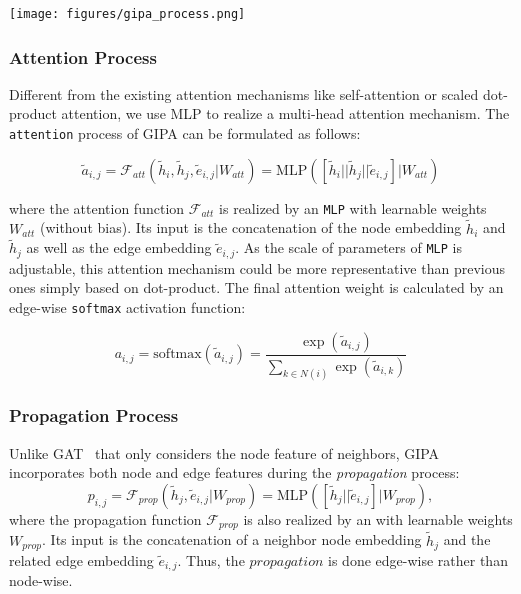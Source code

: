 \documentclass[sigconf]{acmart}
\newcommand{\model}{GIPA\xspace}
\begin{document}
\begin{figure*}
    \centering
    \texttt{[image: figures/gipa\_process.png]}
    \caption{Process of \model, which consists of \textit{attention}, \textit{propagation}, and \textit{aggregation} process.}
    \label{fig:gipa_process}
\end{figure*}

\subsubsection{Attention Process}

Different from the existing attention mechanisms like self-attention or scaled dot-product attention, we use MLP to realize a multi-head attention mechanism.
The \texttt{attention} process of \model can be formulated as follows:

\begin{equation}
\label{eq:att}
\tilde{a}_{i, j} = \mathcal{F}_{att}(\tilde{h}_i, \tilde{h}_j, \tilde{e}_{i, j}|W_{att}) = \text{MLP}([\tilde{h}_i || \tilde{h}_j || \tilde{e}_{i, j}]|W_{att})
\end{equation}

\noindent where the attention function $\mathcal{F}_{att}$ is realized by an \texttt{MLP} with learnable weights $W_{att}$ (without bias). Its input is the concatenation of the node embedding $\tilde{h}_i$ and $\tilde{h}_j$ as well as the edge embedding $\tilde{e}_{i, j}$. As the scale of parameters of \texttt{MLP} is adjustable, this attention mechanism could be more representative than previous ones simply based on dot-product. The final attention weight is calculated by an edge-wise \texttt{softmax} activation function:

\begin{equation}
\label{eq:softmax}
a_{i, j} = \text{softmax}(\tilde{a}_{i, j}) = \frac{\exp(\tilde{a}_{i, j})}{\sum_{k\in N(i)}\exp(\tilde{a}_{i, k})}
\end{equation}

\subsubsection{Propagation Process}

Unlike GAT~\cite{velivckovic2017graph} that only considers the node feature of neighbors, \model incorporates both node and edge features during the \textit{propagation} process:
\begin{equation}
\label{eq:prop}
p_{i, j} = \mathcal{F}_{prop}(\tilde{h}_j, \tilde{e}_{i,j}|W_{prop}) = \text{MLP}([\tilde{h}_j || \tilde{e}_{i, j}]|W_{prop}), 
\end{equation}
\noindent where the propagation function $\mathcal{F}_{prop}$ is also realized by an  with learnable weights $W_{prop}$. Its input is the concatenation of a neighbor node embedding $\tilde{h}_j$ and the related edge embedding $\tilde{e}_{i, j}$. Thus, the $propagation$ is done edge-wise rather than node-wise. 
\end{document}
